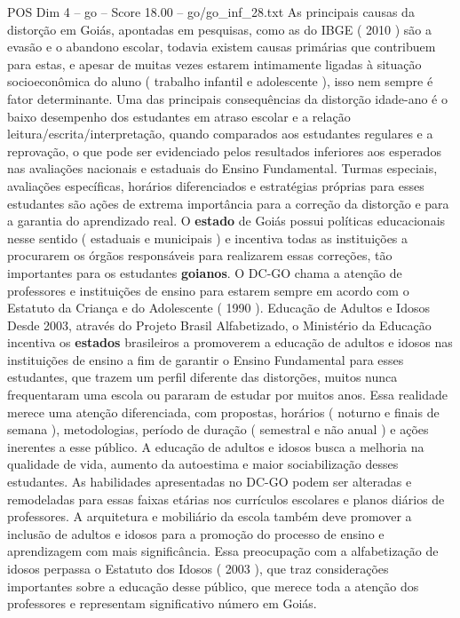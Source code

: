 \begin{textsample}{POS Dim 4 – go – Score 18.00 – go/go\_inf\_28.txt}
As principais causas da distorção em Goiás, apontadas em pesquisas, como as do IBGE ( 2010 ) são a evasão e o abandono escolar, todavia existem causas primárias que contribuem para estas, e apesar de muitas vezes estarem intimamente ligadas à situação socioeconômica do aluno ( trabalho infantil e adolescente ), isso nem sempre é fator determinante.
Uma das principais consequências da distorção idade-ano é o baixo desempenho dos estudantes em atraso escolar e a relação leitura/escrita/interpretação, quando comparados aos estudantes regulares e a reprovação, o que pode ser evidenciado pelos resultados inferiores aos esperados nas avaliações nacionais e estaduais do Ensino Fundamental.
Turmas especiais, avaliações específicas, horários diferenciados e estratégias próprias para esses estudantes são ações de extrema importância para a correção da distorção e para a garantia do aprendizado real.
O \textbf{estado} de Goiás possui políticas educacionais nesse sentido ( estaduais e municipais ) e incentiva todas as instituições a procurarem os órgãos responsáveis para realizarem essas correções, tão importantes para os estudantes \textbf{goianos}.
O DC-GO chama a atenção de professores e instituições de ensino para estarem sempre em acordo com o Estatuto da Criança e do Adolescente ( 1990 ).
Educação de Adultos e Idosos Desde 2003, através do Projeto Brasil Alfabetizado, o Ministério da Educação incentiva os \textbf{estados} brasileiros a promoverem a educação de adultos e idosos nas instituições de ensino a fim de garantir o Ensino Fundamental para esses estudantes, que trazem um perfil diferente das distorções, muitos nunca frequentaram uma escola ou pararam de estudar por muitos anos.
Essa realidade merece uma atenção diferenciada, com propostas, horários ( noturno e finais de semana ), metodologias, período de duração ( semestral e não anual ) e ações inerentes a esse público.
A educação de adultos e idosos busca a melhoria na qualidade de vida, aumento da autoestima e maior sociabilização desses estudantes.
As habilidades apresentadas no DC-GO podem ser alteradas e remodeladas para essas faixas etárias nos currículos escolares e planos diários de professores.
A arquitetura e mobiliário da escola também deve promover a inclusão de adultos e idosos para a promoção do processo de ensino e aprendizagem com mais significância.
Essa preocupação com a alfabetização de idosos perpassa o Estatuto dos Idosos ( 2003 ), que traz considerações importantes sobre a educação desse público, que merece toda a atenção dos professores e representam significativo número em Goiás.

\end{textsample}
